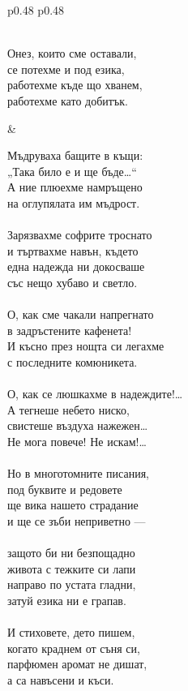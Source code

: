 \documentclass[12pt,a4paper]{article}
\begin{document}
\begin{tabular}{p{0.48\textwidth} p{0.48\textwidth}}
\begin{minipage}[t]{\linewidth}
\\
Онез, които сме оставали,\\
се потехме и под езика,\\
работехме къде що хванем,\\
работехме като добитък.\\
\end{minipage}
&
\begin{minipage}[t]{\linewidth}
Мъдруваха бащите в къщи:\\
„Така било е и ще бъде…“\\
А ние плюехме намръщено\\
на оглупялата им мъдрост.\\
\\
Зарязвахме софрите троснато\\
и търтвахме навън, където\\
една надежда ни докосваше\\
със нещо хубаво и светло.\\
\\
О, как сме чакали напрегнато\\
в задръстените кафенета!\\
И късно през нощта си легахме\\
с последните комюникета.\\
\\
О, как се люшкахме в надеждите!…\\
А тегнеше небето ниско,\\
свистеше въздуха нажежен…\\
Не мога повече! Не искам!…\\
\\
Но в многотомните писания,\\
под буквите и редовете\\
ще вика нашето страдание\\
и ще се зъби неприветно —\\
\\
защото би ни безпощадно\\
живота с тежките си лапи\\
направо по устата гладни,\\
затуй езика ни е грапав.\\
\\
И стиховете, дето пишем,\\
когато краднем от съня си,\\
парфюмен аромат не дишат,\\
а са навъсени и къси.\\

\end{minipage}
\end{tabular}
\end{document}
